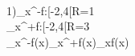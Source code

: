 \\1)\lim_{x^-}f:[-2,4[\rightarrow\mathbb R=1
\\\lim_{x^+}f:[-2,4[\rightarrow\mathbb R=3
\\\lim_{x^-}f(x)\neq\lim_{x^+}f(x)\Rightarrow\nexists\lim_{x}f(x)